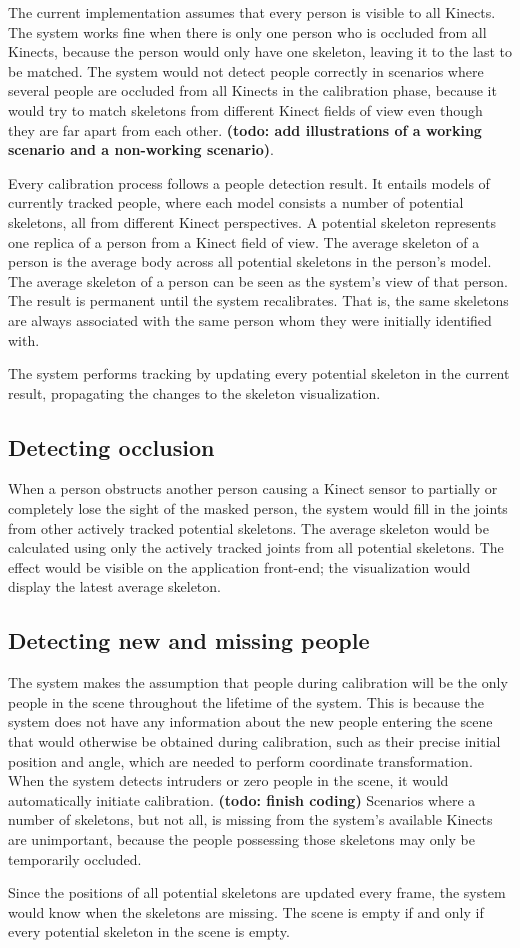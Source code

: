 The current implementation assumes that every person is visible to all Kinects. The system works fine when there is only one person who is occluded from all Kinects, because the person would only have one skeleton, leaving it to the last to be matched. The system would not detect people correctly in scenarios where several people are occluded from all Kinects in the calibration phase, because it would try to match skeletons from different Kinect fields of view even though they are far apart from each other. \textbf{(todo: add illustrations of a working scenario and a non-working scenario)}.

Every calibration process follows a people detection result. It entails models of currently tracked people, where each model consists a number of potential skeletons, all from different Kinect perspectives. A potential skeleton represents one replica of a person from a Kinect field of view. The average skeleton of a person is the average body across all potential skeletons in the person's model. The average skeleton of a person can be seen as the system's view of that person. The result is permanent until the system recalibrates. That is, the same skeletons are always associated with the same person whom they were initially identified with. 

The system performs tracking by updating every potential skeleton in the current result, propagating the changes to the skeleton visualization.

\subsection{Detecting occlusion}

When a person obstructs another person causing a Kinect sensor to partially or completely lose the sight of the masked person, the system would fill in the joints from other actively tracked potential skeletons. The average skeleton would be calculated using only the actively tracked joints from all potential skeletons. The effect would be visible on the application front-end; the visualization would display the latest average skeleton.

\subsection{Detecting new and missing people}

The system makes the assumption that people during calibration will be the only people in the scene throughout the lifetime of the system. This is because the system does not have any information about the new people entering the scene that would otherwise be obtained during calibration, such as their precise initial position and angle, which are needed to perform coordinate transformation. When the system detects intruders or zero people in the scene, it would automatically initiate calibration. \textbf{(todo: finish coding)} Scenarios where a number of skeletons, but not all, is missing from the system's available Kinects are unimportant, because the people possessing those skeletons may only be temporarily occluded.

Since the positions of all potential skeletons are updated every frame, the system would know when the skeletons are missing. The scene is empty if and only if every potential skeleton in the scene is empty.


